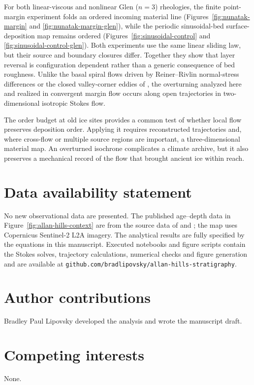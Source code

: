 \documentclass[review]{igs}
\begin{document}
For both linear-viscous and nonlinear Glen (\(n=3\)) rheologies, the finite point-margin experiment folds an ordered incoming material line (Figures~\ref{fig:nunatak-margin} and \ref{fig:nunatak-margin-glen}), while the periodic sinusoidal-bed surface-deposition map remains ordered (Figures~\ref{fig:sinusoidal-control} and \ref{fig:sinusoidal-control-glen}). Both experiments use the same linear sliding law, but their source and boundary closures differ. Together they show that layer reversal is configuration dependent rather than a generic consequence of bed roughness. Unlike the basal spiral flows driven by Reiner--Rivlin normal-stress differences \citep{SchoofClarke2008} or the closed valley-corner eddies of \citet{MeyerCreyts2017}, the overturning analyzed here and realized in convergent margin flow occurs along open trajectories in two-dimensional isotropic Stokes flow.

The order budget at old ice sites provides a common test of whether local flow preserves deposition order. Applying it requires reconstructed trajectories and, where cross-flow or multiple source regions are important, a three-dimensional material map. An overturned isochrone complicates a climate archive, but it also preserves a mechanical record of the flow that brought ancient ice within reach.

\section*{Data availability statement}
No new observational data are presented. The published age--depth data in Figure~\ref{fig:allan-hills-context} are from the source data of \citet{Shackleton2025} and \citet{MarksPeterson2026}; the map uses Copernicus Sentinel-2 L2A imagery. The analytical results are fully specified by the equations in this manuscript. Executed notebooks and figure scripts contain the Stokes solves, trajectory calculations, numerical checks and figure generation and are available at \texttt{github.com/bradlipovsky/allan-hills-stratigraphy}.

\section*{Author contributions}
Bradley Paul Lipovsky developed the analysis and wrote the manuscript draft.

\section*{Competing interests}
None.
\end{document}
